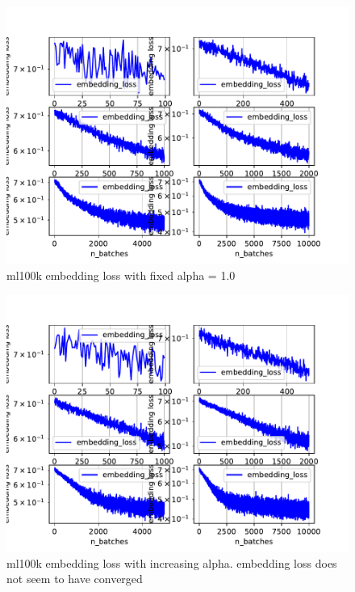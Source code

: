 \documentclass{article}
\begin{document}
\begin{figure}[t!]
\begin{center}
\includegraphics[width=1\textwidth]{figures/ml100k/embedding_loss_multipleplots.pdf}  
\end{center}
\caption{ml100k embedding loss with fixed alpha = 1.0}
\label{fig:ProperCover}
\end{figure}

\begin{figure}[t!]
\begin{center}
\includegraphics[width=1\textwidth]{figures/ml100k/embedding_loss_inc_alpha.pdf}  
\end{center}
\caption{ml100k embedding loss with increasing alpha. embedding loss does not seem to have converged}
\label{fig:ProperCover}
\end{figure}
\end{document}
